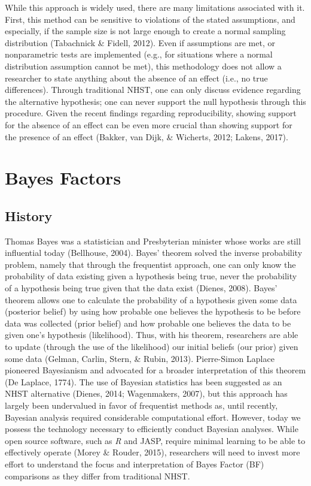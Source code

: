 \documentclass[english,mask,man]{apa6}
\theoremstyle{definition}
\theoremstyle{definition}
\theoremstyle{definition}
\theoremstyle{remark}
\begin{document}
While this approach is widely used, there are many limitations
associated with it. First, this method can be sensitive to violations of
the stated assumptions, and especially, if the sample size is not large
enough to create a normal sampling distribution (Tabachnick \& Fidell,
2012). Even if assumptions are met, or nonparametric tests are
implemented (e.g., for situations where a normal distribution assumption
cannot be met), this methodology does not allow a researcher to state
anything about the absence of an effect (i.e., no true differences).
Through traditional NHST, one can only discuss evidence regarding the
alternative hypothesis; one can never support the null hypothesis
through this procedure. Given the recent findings regarding
reproducibility, showing support for the absence of an effect can be
even more crucial than showing support for the presence of an effect
(Bakker, van Dijk, \& Wicherts, 2012; Lakens, 2017).

\section{Bayes Factors}\label{bayes-factors}

\subsection{History}\label{history-1}

Thomas Bayes was a statistician and Presbyterian minister whose works
are still influential today (Bellhouse, 2004). Bayes' theorem solved the
inverse probability problem, namely that through the frequentist
approach, one can only know the probability of data existing given a
hypothesis being true, never the probability of a hypothesis being true
given that the data exist (Dienes, 2008). Bayes' theorem allows one to
calculate the probability of a hypothesis given some data (posterior
belief) by using how probable one believes the hypothesis to be before
data was collected (prior belief) and how probable one believes the data
to be given one's hypothesis (likelihood). Thus, with his theorem,
researchers are able to update (through the use of the likelihood) our
initial beliefs (our prior) given some data (Gelman, Carlin, Stern, \&
Rubin, 2013). Pierre-Simon Laplace pioneered Bayesianism and advocated
for a broader interpretation of this theorem (De Laplace, 1774). The use
of Bayesian statistics has been suggested as an NHST alternative
(Dienes, 2014; Wagenmakers, 2007), but this approach has largely been
undervalued in favor of frequentist methods as, until recently, Bayesian
analysis required considerable computational effort. However, today we
possess the technology necessary to efficiently conduct Bayesian
analyses. While open source software, such as \emph{R} and JASP, require
minimal learning to be able to effectively operate (Morey \& Rouder,
2015), researchers will need to invest more effort to understand the
focus and interpretation of Bayes Factor (BF) comparisons as they differ
from traditional NHST.
\end{document}
